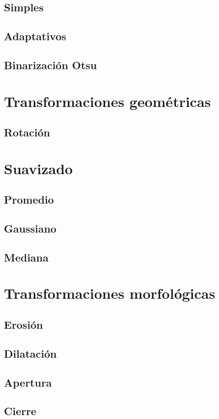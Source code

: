 \subsection{Simples}
\subsection{Adaptativos}
\subsection{Binarización Otsu}

\section{Transformaciones geométricas}
\subsection{Rotación}

\section{Suavizado}
\subsection{Promedio}
\subsection{Gaussiano}
\subsection{Mediana}

\section{Transformaciones morfológicas}
\subsection{Erosión}
\subsection{Dilatación}
\subsection{Apertura}
\subsection{Cierre}
